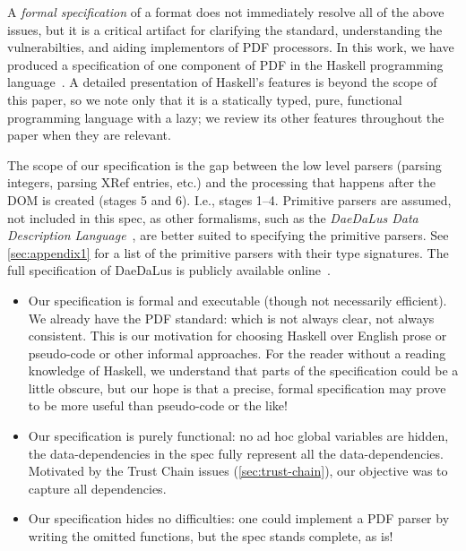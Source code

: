 A \emph{formal specification} of a format does not immediately resolve
all of the above issues, but it is a critical artifact for clarifying
the standard, understanding the vulnerabilties, and aiding
implementors of PDF processors.
%
In this work, we have produced a specification of one component of PDF
in the Haskell programming language~\cite{jones2003haskell}.
%
A detailed presentation of Haskell's features is beyond the scope of
this paper, so we note only that it is a statically typed, pure,
functional programming language with a lazy;
%
we review its other features throughout the paper when they are
relevant.

The scope of our specification is the gap between the low level
parsers (parsing integers, parsing XRef entries, etc.) and the
processing that happens after the DOM is created (stages 5 and 6).
%
I.e., stages 1--4.
%
Primitive parsers are assumed, not included in this spec, as other
formalisms, such as the \emph{DaeDaLus Data Description
  Language}~\cite{daedalusrepo}, are better suited to specifying the
primitive parsers.
%
See \cref{sec:appendix1} for a list of the primitive parsers
with their type signatures.
%
The full specification of DaeDaLus is publicly available
online~\cite{daedalusrepo}.

\begin{itemize}
\item Our specification is formal and executable (though not
  necessarily efficient).
  We already have the PDF standard: which is not always clear, not always
  consistent. 
  This is our motivation for choosing Haskell over English prose or
  pseudo-code or other informal approaches.
  For the reader
  without a reading knowledge of Haskell, we understand that parts of
  the specification could be a little obscure, but our hope is that a
  precise, formal specification may prove to be more useful than
  pseudo-code or the like!
  
\item Our specification is purely functional: no ad hoc global variables are
  hidden, the data-dependencies in the spec fully represent all the
  data-dependencies.  Motivated by the Trust Chain issues
  (\cref{sec:trust-chain}), our objective was to capture all dependencies.
  
\item Our specification hides no difficulties: one could implement a PDF parser
  by writing the omitted functions, but the spec stands complete, as
  is!
\end{itemize}

